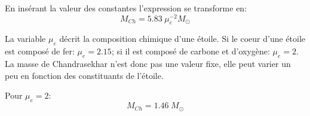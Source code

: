 En insérant la valeur des constantes l'expression se transforme en:
\begin{equation}M_{Ch}=5.83\hspace{3pt}\mu_{e}^{-2}M_\odot\label{Eq. 7.9}\end{equation}

La variable $\mu_{e}$ décrit la composition chimique d'une étoile. Si le coeur d'une étoile est composé de fer: $\mu_{e}=2.15$; si il est composé de carbone et d'oxygène: $\mu_{e}=2$. La masse de Chandrasekhar n'est donc pas une valeur fixe, elle peut varier un peu en fonction des constituants de l'étoile.\bigskip

Pour $\mu_{e}=2$: 
\begin{equation}M_{Ch}=1.46\hspace{3pt}M_\odot\label{Eq. 7.10}\end{equation}


